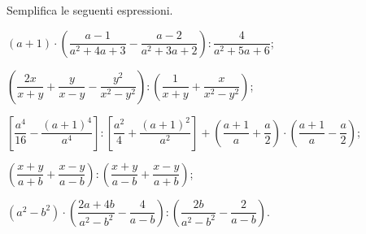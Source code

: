 \begin{esercizio}[\Ast]
\label{ese:14.62}
Semplifica le seguenti espressioni.
\begin{enumeratea}
 \item $(a+1)\cdot\left(\dfrac{a-1}{a^{2}+4a+3}-\dfrac{a-2}{a^{2}+3a+2}\right):\dfrac{4}{a^{2}+5a+6}$;
 \item $\left(\dfrac{2x}{x+y}+\dfrac{y}{x-y}-\dfrac{y^{2}}{x^{2}-y^{2}}\right):\left(\dfrac{1}{x+y}+\dfrac{x}{x^{2}-y^{2}}\right)$;
 \item $\left[\dfrac{a^{4}}{16}-\dfrac{(a+1)^{4}}{a^{4}}\right]:\left[\dfrac{a^{2}}{4}+\dfrac{(a+1)^{2}}{a^{2}}\right]+\left(\dfrac{a+1}{a}+\dfrac{a}{2}\right)\cdot\left(\dfrac{a+1}{a}-\dfrac{a}{2}\right)$;
 \item $\left(\dfrac{x+y}{a+b}+\dfrac{x-y}{a-b}\right):\left(\dfrac{x+y}{a-b}+\dfrac{x-y}{a+b}\right)$;
 \item $\left(a^{2}-b^{2}\right)\cdot\left(\dfrac{2a+4b}{a^{2}-b^{2}}-\dfrac{4}{a-b}\right):\left(\dfrac{2b}{a^{2}-b^{2}}-\dfrac{2}{a-b}\right)$.
\end{enumeratea}
\end{esercizio}


